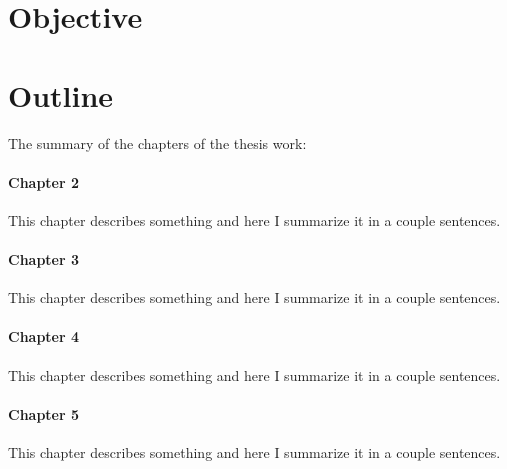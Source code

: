 \section{Objective}

\section{Outline}
The summary of the chapters of the thesis work:

\paragraph{Chapter 2} This chapter describes something and here I summarize it in a couple sentences.

\paragraph{Chapter 3} This chapter describes something and here I summarize it in a couple sentences.

\paragraph{Chapter 4} This chapter describes something and here I summarize it in a couple sentences.

\paragraph{Chapter 5} This chapter describes something and here I summarize it in a couple sentences.

\clearpage %